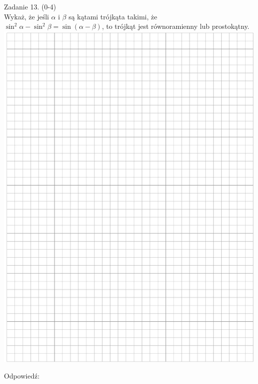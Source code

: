 \documentclass[10pt]{article}
\begin{document}
Zadanie 13. (0-4)\\
Wykaż, że jeśli \(\alpha\) i \(\beta\) są kątami trójkąta takimi, że \(\sin ^{2} \alpha-\sin ^{2} \beta=\sin (\alpha-\beta)\), to trójkąt jest równoramienny lub prostokątny.\\
\includegraphics[max width=\textwidth, center]{2024_11_21_c0ca116654784d42326bg-10}

Odpowiedź:
\end{document}
